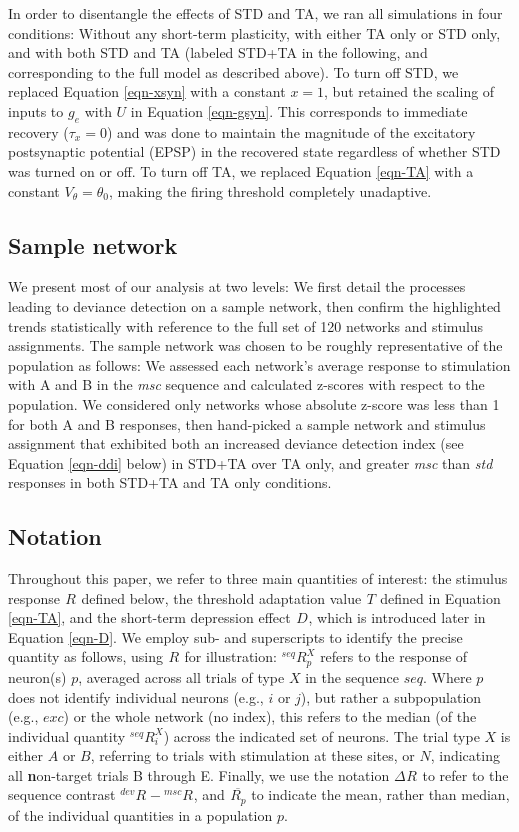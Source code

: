 \documentclass[pdflatex,referee,iicol,sn-basic]{sn-jnl}
\newcommand{\msc}{\textit{msc}}
\newcommand{\std}{\textit{std}}
\renewcommand{\R}[3][]{{}^{#1}_{}\!R^{#2}_{#3}}
\renewcommand{\T}[3][]{{}^{#1}_{}T^{#2}_{#3}}
\newcommand{\D}[3][]{{}^{#1}_{}\!D^{#2}_{#3}}
\newcommand{\mean}[1]{\overline{#1}}
\theoremstyle{thmstyleone}%
\theoremstyle{thmstyletwo}%
\theoremstyle{thmstylethree}%
\begin{document}
In order to disentangle the effects of STD and TA, we ran all simulations in four conditions: Without any short-term plasticity, with either TA only or STD only, and with both STD and TA (labeled STD+TA in the following, and corresponding to the full model as described above). To turn off STD, we replaced Equation \ref{eqn-xsyn} with a constant $x = 1$, but retained the scaling of inputs to $g_e$ with $U$ in Equation \ref{eqn-gsyn}. This corresponds to immediate recovery ($\tau_x = 0$) and was done to maintain the magnitude of the excitatory postsynaptic potential (EPSP) in the recovered state regardless of whether STD was turned on or off. To turn off TA, we replaced Equation \ref{eqn-TA} with a constant $V_{\theta} = \theta_0$, making the firing threshold completely unadaptive.

\subsection{Sample network}\label{sec-sample}

We present most of our analysis at two levels: We first detail the processes leading to deviance detection on a sample network, then confirm the highlighted trends statistically with reference to the full set of 120 networks and stimulus assignments. The sample network was chosen to be roughly representative of the population as follows: We assessed each network's average response to stimulation with A and B in the \msc{} sequence and calculated z-scores with respect to the population. We considered only networks whose absolute z-score was less than 1 for both A and B responses, then hand-picked a sample network and stimulus assignment that exhibited both an increased deviance detection index (see Equation \ref{eqn-ddi} below) in STD+TA over TA only, and greater \msc{} than \std{} responses in both STD+TA and TA only conditions.

\subsection{Notation}\label{sec-notation}

Throughout this paper, we refer to three main quantities of interest: the stimulus response $\R{}{}$ defined below, the threshold adaptation value $\T{}{}$ defined in Equation \ref{eqn-TA}, and the short-term depression effect $\D{}{}$, which is introduced later in Equation \ref{eqn-D}. We employ sub- and superscripts to identify the precise quantity as follows, using $\R{}{}$ for illustration: $\R[seq]{X}{p}$ refers to the response of neuron(s) $p$, averaged across all trials of type $X$ in the sequence $seq$. Where $p$ does not identify individual neurons (e.g., $i$ or $j$), but rather a subpopulation (e.g., $exc$) or the whole network (no index), this refers to the median (of the individual quantity $\R[seq]{X}{i}$) across the indicated set of neurons. The trial type $X$ is either $A$ or $B$, referring to trials with stimulation at these sites, or $N$, indicating all \textbf{n}on-target trials B through E. Finally, we use the notation $\Delta \R{}{}$ to refer to the sequence contrast $\R[dev]{}{} - \R[msc]{}{}$, and $\mean{\R{}{p}}$ to indicate the mean, rather than median, of the individual quantities in a population $p$.
\end{document}
